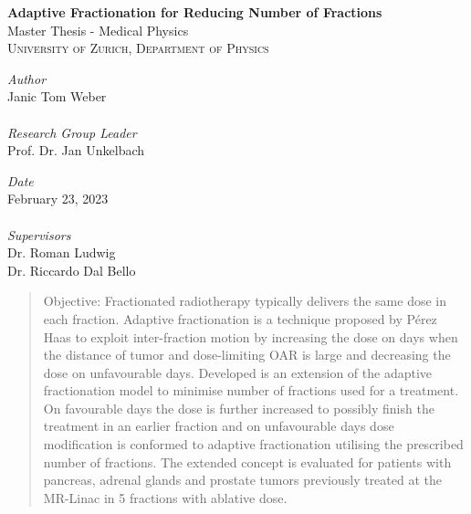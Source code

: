 \documentclass[\relativeRoot/ada.tex]{subfiles}
\begin{document}
\begin{titlepage}

\HRulebeta

\vspace{3cm}
  {\bfseries
	\Large\textbf{Adaptive Fractionation for Reducing Number of Fractions}
	}\\[14pt]
	{Master Thesis - Medical Physics}\\[1pt]
	\textsc{University of Zurich, Department of Physics}
	\\[5pt]
	
\begin{addmargin}[1cm]{1cm}


\begin{minipage}[t]{0.6\textwidth}
\emph{Author}\\
Janic Tom Weber\\\\
\emph{Research Group Leader}\\
Prof. Dr. Jan Unkelbach \\
\end{minipage}
\begin{minipage}[t]{0.34\textwidth}
\emph{Date}\\
February 23, 2023\\\\
\emph{Supervisors}\\
Dr. Roman Ludwig \\
Dr. Riccardo Dal Bello\\[10pt]
\end{minipage}

\end{addmargin}

	

	
\begin{abstract}

    Objective: Fractionated radiotherapy typically delivers the same dose in each fraction. Adaptive fractionation is a technique proposed by Pérez Haas \cite{perezhaas_adaptive} to exploit inter-fraction motion by increasing the dose on days when the distance of tumor and dose-limiting OAR is large and decreasing the dose on unfavourable days. Developed is an extension of the adaptive fractionation model to minimise number of fractions used for a treatment. On favourable days the dose is further increased to possibly finish the treatment in an earlier fraction and on unfavourable days dose modification is conformed to adaptive fractionation utilising the prescribed number of fractions. The extended concept is evaluated for patients with pancreas, adrenal glands and prostate tumors previously treated at the MR-Linac in 5 fractions with ablative dose.


\end{abstract}
\end{titlepage}
\end{document}
